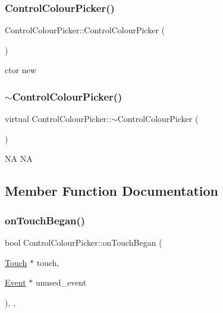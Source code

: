 \subsubsection{\texorpdfstring{Control\+Colour\+Picker()}{ControlColourPicker()}\hspace{0.1cm}{\footnotesize\ttfamily [2/2]}}
{\footnotesize\ttfamily Control\+Colour\+Picker\+::\+Control\+Colour\+Picker (\begin{DoxyParamCaption}{ }\end{DoxyParamCaption})}

ctor  new \mbox{\label{classControlColourPicker_af17bfe9f321085f3099d7a987461afe9}} 
\subsubsection{\texorpdfstring{$\sim$\+Control\+Colour\+Picker()}{~ControlColourPicker()}\hspace{0.1cm}{\footnotesize\ttfamily [2/2]}}
{\footnotesize\ttfamily virtual Control\+Colour\+Picker\+::$\sim$\+Control\+Colour\+Picker (\begin{DoxyParamCaption}{ }\end{DoxyParamCaption})\hspace{0.3cm}{\ttfamily [virtual]}}

NA  NA 

\subsection{Member Function Documentation}
\mbox{\label{classControlColourPicker_a83493e9deb3c69dd40be99009a4759d6}} 
\subsubsection{\texorpdfstring{on\+Touch\+Began()}{onTouchBegan()}\hspace{0.1cm}{\footnotesize\ttfamily [1/2]}}
{\footnotesize\ttfamily bool Control\+Colour\+Picker\+::on\+Touch\+Began (\begin{DoxyParamCaption}\item[{\hyperlink{classTouch}{Touch} $\ast$}]{touch,  }\item[{\hyperlink{classEvent}{Event} $\ast$}]{unused\+\_\+event }\end{DoxyParamCaption})\hspace{0.3cm}{\ttfamily [override]}, {\ttfamily [protected]}, {\ttfamily [virtual]}}



